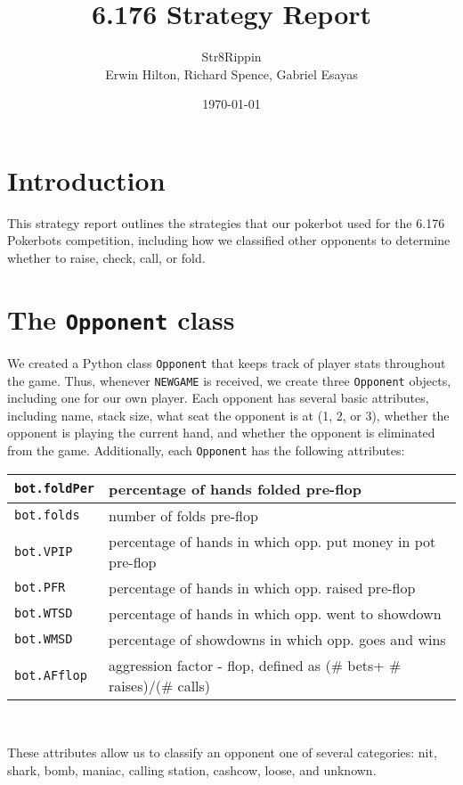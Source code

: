 \documentclass{article}
\title{6.176 Strategy Report}
\author{Str8Rippin \\
Erwin Hilton, Richard Spence, Gabriel Esayas}
\date{\today}
\begin{document}
\maketitle

\section*{Introduction}
This strategy report outlines the strategies that our pokerbot used for the 6.176 Pokerbots competition, including how we classified other opponents to determine whether to raise, check, call, or fold.

\section*{The \texttt{Opponent} class}
We created a Python class \texttt{Opponent} that keeps track of player stats throughout the game. Thus, whenever \texttt{NEWGAME} is received, we create three \texttt{Opponent} objects, including one for our own player. Each opponent has several basic attributes, including name, stack size, what seat the opponent is at (1, 2, or 3), whether the opponent is playing the current hand, and whether the opponent is eliminated from the game. Additionally, each \texttt{Opponent} has the following attributes: \\

\begin{tabular}{|l|l|}  \hline
\texttt{bot.foldPer} & percentage of hands folded pre-flop \\ \hline
\texttt{bot.folds} & number of folds pre-flop \\ \hline
\texttt{bot.VPIP} & percentage of hands in which opp. put money in pot pre-flop  \\ \hline
\texttt{bot.PFR} & percentage of hands in which opp. raised pre-flop \\ \hline
\texttt{bot.WTSD} & percentage of hands in which opp. went to showdown \\ \hline
\texttt{bot.WMSD} & percentage of showdowns in which opp. goes and wins \\ \hline
\texttt{bot.AFflop} & aggression factor - flop, defined as (\# bets+ \# raises)/(\# calls) \\ \hline

\end{tabular} \\
\vspace{0.5in}

These attributes allow us to classify an opponent one of several categories: nit, shark, bomb, maniac, calling station, cashcow, loose, and unknown. 
\end{document}
